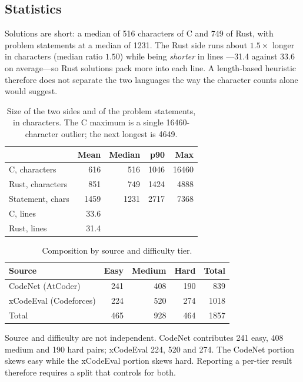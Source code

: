 \subsection{Statistics}

Solutions are short: a median of 516 characters of C and 749 of Rust, with
problem statements at a median of 1231. The Rust side runs about $1.5\times$
longer in characters (median ratio $1.50$) while being \emph{shorter} in lines
---31.4 against 33.6 on average---so Rust solutions pack more into each line.
A length-based heuristic therefore does not separate the two languages the way
the character counts alone would suggest.

\ifextended
\begin{table}[tbp]
\caption{Size of the two sides and of the problem statements, in characters.
The C maximum is a single 16460-character outlier; the next longest is 4649.}
\label{tab:sizes}
\centering
\begin{tabular}{lrrrr}
\toprule
 & Mean & Median & p90 & Max \\
\midrule
C, characters     & 616  & 516  & 1046 & 16460 \\
Rust, characters  & 851  & 749  & 1424 & 4888 \\
Statement, chars  & 1459 & 1231 & 2717 & 7368 \\
\midrule
C, lines          & 33.6 & & & \\
Rust, lines       & 31.4 & & & \\
\bottomrule
\end{tabular}
\end{table}

\begin{table}[tbp]
\caption{Composition by source and difficulty tier.}
\label{tab:composition}
\centering
\begin{tabular}{lrrrr}
\toprule
Source & Easy & Medium & Hard & Total \\
\midrule
CodeNet (AtCoder)      & 241 & 408 & 190 & 839 \\
xCodeEval (Codeforces) & 224 & 520 & 274 & 1018 \\
\midrule
Total                  & 465 & 928 & 464 & 1857 \\
\bottomrule
\end{tabular}
\end{table}
\fi


Source and difficulty are not independent. CodeNet contributes 241 easy, 408
medium and 190 hard pairs; xCodeEval 224, 520 and 274. The CodeNet portion
skews easy while
the xCodeEval portion skews hard. Reporting a per-tier result therefore
requires a split that controls for both.

